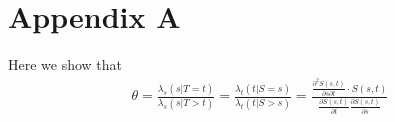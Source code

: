 \documentclass[]{article}
\begin{document}
%
%
%


%




\section{Appendix A} \label{appendixA}
Here we show that 
	$$
	\begin{aligned}
	  \theta = \frac{ \lambda_s(s|T=t)}{\lambda_s(s|T>t)} = \frac{ \lambda_t(t|S=s)}{\lambda_t(t|S>s)} = \frac{ \frac{\partial^2 S(s, t)}{\partial s\partial t} \cdot S(s, t)}    {\frac{\partial S(s, t)}{\partial t} \frac{\partial S(s, t)}{\partial s}}
	\end{aligned}
	$$
\end{document}
